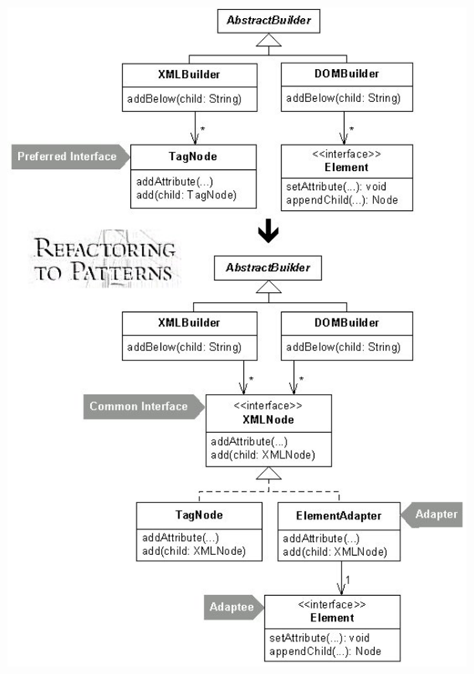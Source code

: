 \documentclass[a4paper, fontsize=6pt]{scrartcl}
\begin{document}
\begin{multicols*}{5}
\includegraphics[scale=0.2]{interfacesWithAdapter.jpg}

\end{multicols*}
\end{document}
